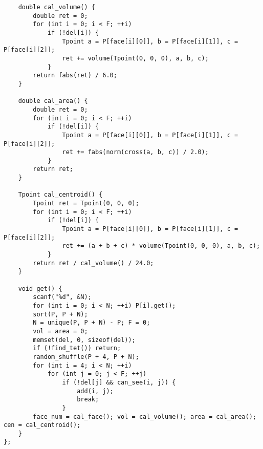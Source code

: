 \begin{verbatim}
    double cal_volume() {
        double ret = 0;
        for (int i = 0; i < F; ++i)
            if (!del[i]) {
                Tpoint a = P[face[i][0]], b = P[face[i][1]], c = P[face[i][2]];
                ret += volume(Tpoint(0, 0, 0), a, b, c);
            }
        return fabs(ret) / 6.0;
    }

    double cal_area() {
        double ret = 0;
        for (int i = 0; i < F; ++i)
            if (!del[i]) {
                Tpoint a = P[face[i][0]], b = P[face[i][1]], c = P[face[i][2]];
                ret += fabs(norm(cross(a, b, c)) / 2.0);
            }
        return ret;
    }

    Tpoint cal_centroid() {
        Tpoint ret = Tpoint(0, 0, 0);
        for (int i = 0; i < F; ++i)
            if (!del[i]) {
                Tpoint a = P[face[i][0]], b = P[face[i][1]], c = P[face[i][2]];
                ret += (a + b + c) * volume(Tpoint(0, 0, 0), a, b, c);
            }
        return ret / cal_volume() / 24.0;
    }

    void get() {
        scanf("%d", &N);
        for (int i = 0; i < N; ++i) P[i].get();
        sort(P, P + N);
        N = unique(P, P + N) - P; F = 0;    
        vol = area = 0;
        memset(del, 0, sizeof(del));
        if (!find_tet()) return;
        random_shuffle(P + 4, P + N);
        for (int i = 4; i < N; ++i)
            for (int j = 0; j < F; ++j)
                if (!del[j] && can_see(i, j)) {
                    add(i, j);
                    break;
                }
        face_num = cal_face(); vol = cal_volume(); area = cal_area(); cen = cal_centroid();
    }
};
\end{verbatim}
